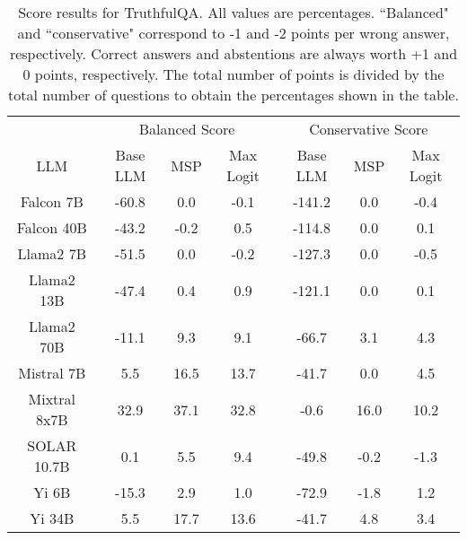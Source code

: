 \begin{table*}
\centering
\begin{tabular}{c|c|c|c|c|c|c}
& \multicolumn{3}{c|}{Balanced Score} & \multicolumn{3}{c}{Conservative Score} \\ 
LLM & Base LLM & MSP & Max Logit & Base LLM & MSP & Max Logit\\ \hline
Falcon 7B & -60.8 & 0.0 & -0.1 & -141.2 & 0.0 & -0.4\\
Falcon 40B & -43.2 & -0.2 & 0.5 & -114.8 & 0.0 & 0.1\\
Llama2 7B & -51.5 & 0.0 & -0.2 & -127.3 & 0.0 & -0.5\\
Llama2 13B & -47.4 & 0.4 & 0.9 & -121.1 & 0.0 & 0.1\\
Llama2 70B & -11.1 & 9.3 & 9.1 & -66.7 & 3.1 & 4.3\\
Mistral 7B & 5.5 & 16.5 & 13.7 & -41.7 & 0.0 & 4.5\\
Mixtral 8x7B & 32.9 & 37.1 & 32.8 & -0.6 & 16.0 & 10.2\\
SOLAR 10.7B & 0.1 & 5.5 & 9.4 & -49.8 & -0.2 & -1.3\\
Yi 6B & -15.3 & 2.9 & 1.0 & -72.9 & -1.8 & 1.2\\
Yi 34B & 5.5 & 17.7 & 13.6 & -41.7 & 4.8 & 3.4\\
\hline
\end{tabular}
\caption{Score results for TruthfulQA. All values are percentages. ``Balanced" and ``conservative" correspond to -1 and -2 points per wrong answer, respectively. Correct answers and abstentions are always worth +1 and 0 points, respectively. The total number of points is divided by the total number of questions to obtain the percentages shown in the table.}
\label{tab:truthfulqa_score}
\end{table*}
